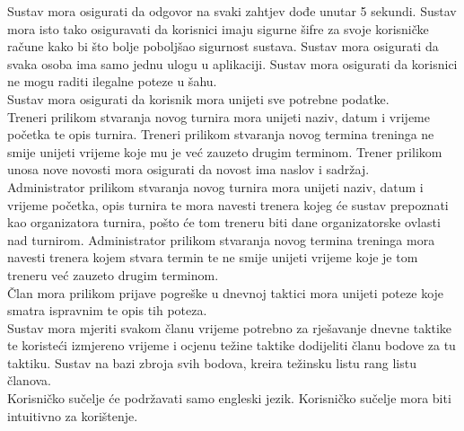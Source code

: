 			Sustav mora osigurati da odgovor na svaki zahtjev dođe unutar 5 sekundi. Sustav mora isto tako osiguravati da korisnici imaju sigurne šifre za svoje korisničke račune kako bi što bolje poboljšao sigurnost sustava. Sustav mora osigurati da svaka osoba ima samo jednu ulogu u aplikaciji. Sustav mora osigurati da korisnici ne mogu raditi ilegalne poteze u šahu.\\
			Sustav mora osigurati da korisnik mora unijeti sve potrebne podatke. \\
			Treneri prilikom stvaranja novog turnira mora unijeti naziv, datum i vrijeme početka te opis turnira. Treneri prilikom stvaranja novog termina treninga ne smije unijeti vrijeme koje mu je već zauzeto drugim terminom. Trener prilikom unosa nove novosti mora osigurati da novost ima naslov i sadržaj. \\
			Administrator prilikom stvaranja novog turnira mora unijeti naziv, datum i vrijeme početka, opis turnira te mora navesti trenera kojeg će sustav prepoznati kao organizatora turnira, pošto će tom treneru biti dane organizatorske ovlasti nad turnirom. Administrator prilikom stvaranja novog termina treninga mora navesti trenera kojem stvara termin te ne smije unijeti vrijeme koje je tom treneru već zauzeto drugim terminom.\\
			Član mora prilikom prijave pogreške u dnevnoj taktici mora unijeti poteze koje smatra ispravnim te opis tih poteza.\\
			Sustav mora mjeriti svakom članu vrijeme potrebno za rješavanje dnevne taktike te koristeći izmjereno vrijeme i ocjenu težine taktike dodijeliti članu bodove za tu taktiku. Sustav na bazi zbroja svih bodova, kreira težinsku listu rang listu članova.\\
			Korisničko sučelje će podržavati samo engleski jezik. Korisničko sučelje mora biti intuitivno za korištenje.\\
			
		 
			 
			 
			 
			 
	